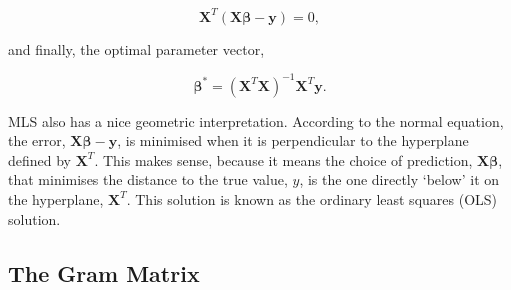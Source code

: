 \documentclass[11pt]{amsart}
\begin{document}
$$\mathbf{X}^T(\mathbf{X}\boldsymbol\beta - \mathbf{y}) = 0,$$

and finally, the optimal parameter vector,

$$\boldsymbol\beta^* = (\mathbf{X}^T\mathbf{X})^{-1}\mathbf{X}^T\mathbf{y}.$$

MLS also has a nice geometric interpretation. According to the normal equation, the error, $\mathbf{X}\boldsymbol\beta - \mathbf{y}$, is minimised when it is perpendicular to the hyperplane defined by $\mathbf{X}^T$. This makes sense, because it means the choice of prediction, $\mathbf{X}\boldsymbol\beta$, that minimises the distance to the true value, $y$, is the one directly `below' it on the hyperplane, $\mathbf{X}^T$. This solution is known as the ordinary least squares (OLS) solution.

\subsection{The Gram Matrix}
\end{document}
